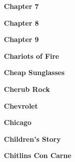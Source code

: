\newline
\vspace{10pt} 
\begin{center}\textbf{Chapter 7}\end{center}
\newline
\vspace{10pt} 
\begin{center}\textbf{Chapter 8}\end{center}
\newline
\vspace{10pt} 
\begin{center}\textbf{Chapter 9}\end{center}
\newline
\vspace{10pt} 
\begin{center}\textbf{Chariots of Fire}\end{center}
\newline
\vspace{10pt} 
\begin{center}\textbf{Cheap Sunglasses}\end{center}
\newline
\vspace{10pt} 
\begin{center}\textbf{Cherub Rock}\end{center}
\newline
\vspace{10pt} 
\begin{center}\textbf{Chevrolet}\end{center}
\newline
\vspace{10pt} 
\begin{center}\textbf{Chicago}\end{center}
\newline
\vspace{10pt} 
\begin{center}\textbf{Children's Story}\end{center}
\newline
\vspace{10pt} 
\begin{center}\textbf{Chitlins Con Carne}\end{center}
